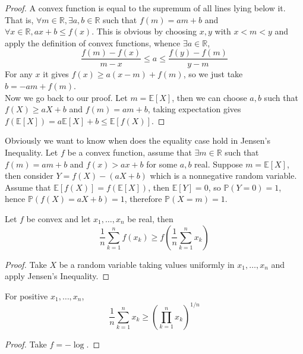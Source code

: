 \begin{proof}
    A convex function is equal to the supremum of all lines lying below it.
    That is, $\forall m\in\mathbb R,\exists a,b\in\mathbb R$ such that $f(m)=am+b$ and $\forall x\in\mathbb R,ax+b\le f(x)$.
    This is obvious by choosing $x,y$ with $x<m<y$ and apply the definition of convex functions, whence $\exists a\in\mathbb R$,
    $$\frac{f(m)-f(x)}{m-x}\le a\le \frac{f(y)-f(m)}{y-m}$$
    For any $x$ it gives $f(x)\ge a(x-m)+f(m)$, so we just take $b=-am+f(m)$.\\
    Now we go back to our proof.
    Let $m=\mathbb E[X]$, then we can choose $a,b$ such that $f(X)\ge aX+b$ and $f(m)=am+b$, taking expectation gives $f(\mathbb E[X])=a\mathbb E[X]+b\le \mathbb E[f(X)]$.
\end{proof}
Obviously we want to know when does the equality case hold in Jensen's Inequality.
Let $f$ be a convex function, assume that $\exists m\in\mathbb R$ such that $f(m)=am+b$ and $f(x)>ax+b$ for some $a,b$ real.
Suppose $m=\mathbb E[X]$, then consider $Y=f(X)-(aX+b)$ which is a nonnegative random variable.
Assume that $\mathbb E[f(X)]=f(\mathbb E[X])$, then $\mathbb E[Y]=0$, so $\mathbb P(Y=0)=1$, hence $\mathbb P(f(X)=aX+b)=1$, therefore $\mathbb P(X=m)=1$.
\begin{corollary}
    Let $f$ be convex and let $x_1,\ldots,x_n$ be real, then
    $$\frac{1}{n}\sum_{k=1}^nf(x_k)\ge f\left(\frac{1}{n}\sum_{k=1}^nx_k \right)$$
\end{corollary}
\begin{proof}
    Take $X$ be a random variable taking values uniformly in $x_1,\ldots,x_n$ and apply Jensen's Inequality.
\end{proof}
\begin{corollary}
    For positive $x_1,\ldots,x_n$,
    $$\frac{1}{n}\sum_{k=1}^nx_k\ge \left( \prod_{k=1}^nx_k \right)^{1/n}$$
\end{corollary}
\begin{proof}
    Take $f=-\log$.
\end{proof}
